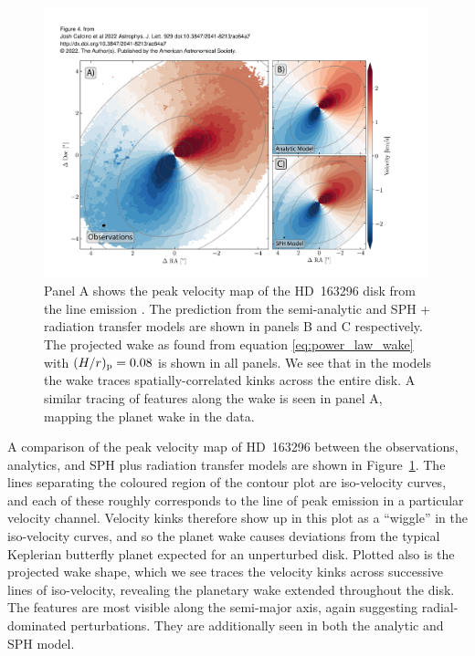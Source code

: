 \begin{figure}
    \centering
    \includegraphics[width = 0.99\textwidth]{figures/calcino_v0.pdf}
    \caption{Panel A shows the peak velocity map of the HD~163296 disk from the line emission \citep{oberg2021}. The prediction from the semi-analytic and SPH + radiation transfer models are shown in panels B and C respectively. The projected wake as found from equation \ref{eq:power_law_wake} with $(H/r)_{\rm p}=0.08$ is shown in all panels. We see that in the models the wake traces spatially-correlated kinks across the entire disk. A similar tracing of features along the wake is seen in panel A, mapping the planet wake in the data.}
    \label{fig:calcino_v0}
\end{figure}

A comparison of the peak velocity map of HD~163296 between the observations, analytics, and SPH plus radiation transfer models are shown in Figure~\ref{fig:calcino_v0}.
The lines separating the coloured region of the contour plot are iso-velocity curves, and each of these roughly corresponds to the line of peak emission in a particular velocity channel.
Velocity kinks therefore show up in this plot as a ``wiggle'' in the iso-velocity curves, and so the planet wake causes deviations from the typical Keplerian butterfly planet expected for an unperturbed disk.
Plotted also is the projected wake shape, which we see traces the velocity kinks across successive lines of iso-velocity, revealing the planetary wake extended throughout the disk. 
The features are most visible along the semi-major axis, again suggesting radial-dominated perturbations.
They are additionally seen in both the analytic and SPH model.

